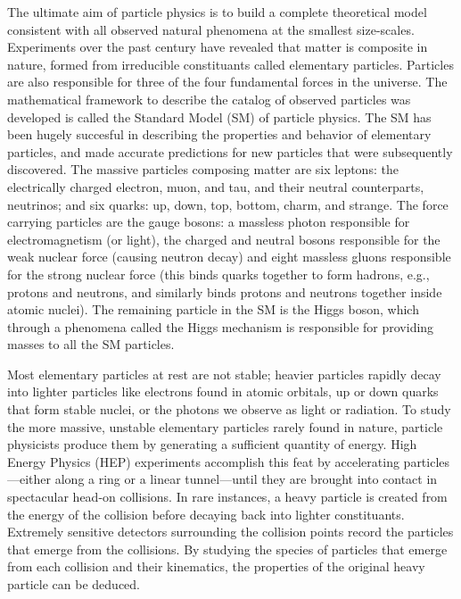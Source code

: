 



The ultimate aim of particle physics is to build a complete theoretical model consistent with all observed natural phenomena at the smallest size-scales. Experiments over the past century have revealed that matter is composite in nature, formed from irreducible constituants called elementary particles. Particles are also responsible for three of the four fundamental forces in the universe. The mathematical framework to describe the catalog of observed particles was developed is called the Standard Model (SM) of particle physics. The SM has been hugely succesful in describing the properties and behavior of elementary particles, and made accurate predictions for new particles that were subsequently discovered. The massive particles composing matter are six leptons: the electrically charged electron, muon, and tau, and their neutral counterparts, neutrinos; and six quarks: up, down, top, bottom, charm, and strange. The force carrying particles are the gauge bosons: a massless photon responsible for electromagnetism (or light), the charged \PW and neutral \PZ bosons responsible for the weak nuclear force (causing neutron decay) and eight massless gluons responsible for the strong nuclear force (this binds quarks together to form hadrons, e.g., protons and neutrons, and similarly binds protons and neutrons together inside atomic nuclei). The remaining particle in the SM is the Higgs boson, which through a phenomena called the Higgs mechanism is responsible for providing masses to all the SM particles.
 
Most elementary particles at rest are not stable; heavier particles rapidly decay into lighter particles like electrons found in atomic orbitals, up or down quarks that form stable nuclei, or the photons we observe as light or radiation. To study the more massive, unstable elementary particles rarely found in nature, particle physicists produce them by generating a sufficient quantity of energy. High Energy Physics (HEP) experiments accomplish this feat by accelerating particles---either along a ring or a linear tunnel---until they are brought into contact in spectacular head-on collisions. In rare instances, a heavy particle is created from the energy of the collision before decaying back into lighter constituants. Extremely sensitive detectors surrounding the collision points record the particles that emerge from the collisions. By studying the species of particles that emerge from each collision and their kinematics, the properties of the original heavy particle can be deduced.

